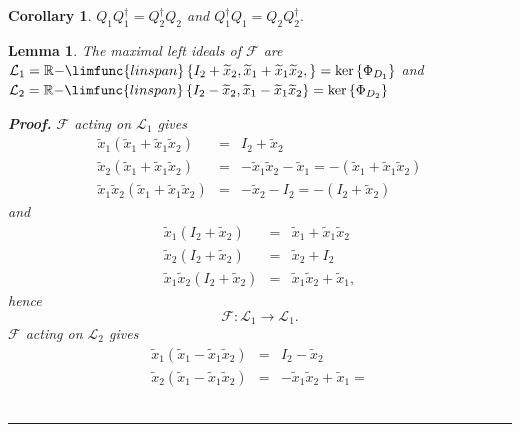 \documentclass[aps,preprint]{revtex4}
\newtheorem{corollary}[theorem]{Corollary}
\newtheorem{lemma}[theorem]{Lemma}
\newenvironment{proof}[1][Proof]{\noindent\textbf{#1.} }{\ \rule{0.5em}{0.5em}}
\begin{document}
\begin{corollary}
$Q_{1}Q_{1}^{\dagger }=Q_{2}^{\dagger }Q_{2}$ and $Q_{1}^{\dagger
}Q_{1}=Q_{2}Q_{2}^{\dagger }.$
\end{corollary}

\begin{lemma}
The maximal left ideals of $\mathcal{F}$ are $\mathcal{L}_{1}=\mathbb{R-}%
\limfunc{linspan}\left\{ I_{2}+\widetilde{x}_{2},\widetilde{x}_{1}+%
\widetilde{x}_{1}\widetilde{x}_{2},\right\} =\ker \left\{ \Phi
_{D_{1}}\right\} $ and $\mathcal{L}_{2}=\mathbb{R-}\limfunc{linspan}\left\{
I_{2}-\widetilde{x}_{2},\widetilde{x}_{1}-\widetilde{x}_{1}\widetilde{x}%
_{2}\right\} =\ker \left\{ \Phi _{D_{2}}\right\} $

\begin{proof}
$\mathcal{F}$ acting on $\mathcal{L}_{1}$ gives 
\begin{eqnarray}
\widetilde{x}_{1}\left( \widetilde{x}_{1}+\widetilde{x}_{1}\widetilde{x}%
_{2}\right) &=&I_{2}+\widetilde{x}_{2} \\
\widetilde{x}_{2}\left( \widetilde{x}_{1}+\widetilde{x}_{1}\widetilde{x}%
_{2}\right) &=&-\widetilde{x}_{1}\widetilde{x}_{2}-\widetilde{x}_{1}=-\left( 
\widetilde{x}_{1}+\widetilde{x}_{1}\widetilde{x}_{2}\right) \\
\widetilde{x}_{1}\widetilde{x}_{2}\left( \widetilde{x}_{1}+\widetilde{x}_{1}%
\widetilde{x}_{2}\right) &=&-\widetilde{x}_{2}-I_{2}=-\left( I_{2}+%
\widetilde{x}_{2}\right)
\end{eqnarray}%
and 
\begin{eqnarray}
\widetilde{x}_{1}\left( I_{2}+\widetilde{x}_{2}\right) &=&\widetilde{x}_{1}+%
\widetilde{x}_{1}\widetilde{x}_{2} \\
\widetilde{x}_{2}\left( I_{2}+\widetilde{x}_{2}\right) &=&\widetilde{x}%
_{2}+I_{2} \\
\widetilde{x}_{1}\widetilde{x}_{2}\left( I_{2}+\widetilde{x}_{2}\right) &=&%
\widetilde{x}_{1}\widetilde{x}_{2}+\widetilde{x}_{1},
\end{eqnarray}%
hence 
\begin{equation}
\mathcal{F}:\mathcal{L}_{1}\rightarrow \mathcal{L}_{1}.
\end{equation}%
$\mathcal{F}$ acting on $\mathcal{L}_{2}$ gives 
\begin{eqnarray}
\widetilde{x}_{1}\left( \widetilde{x}_{1}-\widetilde{x}_{1}\widetilde{x}%
_{2}\right) &=&I_{2}-\widetilde{x}_{2} \\
\widetilde{x}_{2}\left( \widetilde{x}_{1}-\widetilde{x}_{1}\widetilde{x}%
_{2}\right) &=&-\widetilde{x}_{1}\widetilde{x}_{2}+\widetilde{x}_{1}=%

\end{eqnarray}
\end{proof}
\end{lemma}
\end{document}

